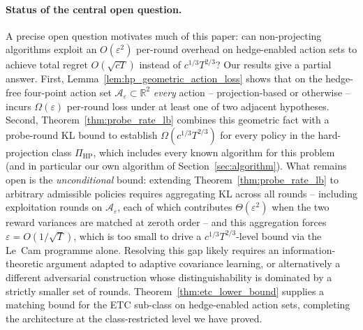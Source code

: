 \documentclass[11pt]{article}
\newcommand{\R}{\mathbb{R}}
\newcommand{\cA}{\mathcal{A}}
\begin{document}
\paragraph{Status of the central open question.}
A precise open question motivates much of this paper: can non-projecting
algorithms exploit an $O(\varepsilon^2)$ per-round overhead on
hedge-enabled action sets to achieve total regret $O(\sqrt{cT})$ instead
of $c^{1/3}T^{2/3}$?
Our results give a partial answer.  First,
Lemma~\ref{lem:hp_geometric_action_loss} shows that on the hedge-free
four-point action set $\cA_\varepsilon\subset\R^2$ \emph{every} action
-- projection-based or otherwise -- incurs $\Omega(\varepsilon)$
per-round loss under at least one of two adjacent hypotheses.
Second, Theorem~\ref{thm:probe_rate_lb} combines this geometric fact
with a probe-round KL bound to establish $\Omega(c^{1/3}T^{2/3})$ for
every policy in the hard-projection class $\Pi_{\mathrm{HP}}$, which
includes every known algorithm for this problem (and in particular our
own algorithm of Section~\ref{sec:algorithm}).
What remains open is the \emph{unconditional} bound: extending
Theorem~\ref{thm:probe_rate_lb} to arbitrary admissible policies
requires aggregating KL across all rounds -- including exploitation
rounds on $\cA_\varepsilon$, each of which contributes
$\Theta(\varepsilon^2)$ when the two reward variances are matched at
zeroth order -- and this aggregation forces $\varepsilon=O(1/\sqrt T)$,
which is too small to drive a $c^{1/3}T^{2/3}$-level bound via the
Le~Cam programme alone.  Resolving this gap likely requires an
information-theoretic argument adapted to adaptive covariance learning,
or alternatively a different adversarial construction whose
distinguishability is dominated by a strictly smaller set of rounds.
Theorem~\ref{thm:etc_lower_bound} supplies a matching bound for the ETC
sub-class on hedge-enabled action sets, completing the architecture at
the class-restricted level we have proved.
\end{document}
